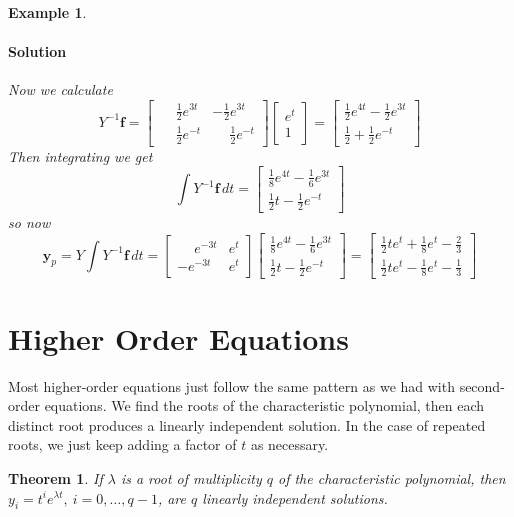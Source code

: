 \documentclass[letterpaper, 11pt, openany]{book}
\theoremstyle{mytheoremstyle}
\newtheorem{theorem}{Theorem}[section]
\theoremstyle{myexamplestyle}
\newtheorem{example}{Example}[section]
\newenvironment{solution}{\paragraph{\sffamily \smaller \fontseries{b}\selectfont Solution}}{\hfill\faSquare}
\begin{document}
\begin{example}
\begin{solution}
        Now we calculate \[Y^{-1} \mathbf{f} = \begin{bmatrix}
            \phantom{-}\frac{1}{2}e^{3t} & -\frac{1}{2} e^{3t}\\
            \phantom{-}\frac{1}{2} e^{-t} &  \phantom{-}\frac{1}{2}e^{-t}
       \end{bmatrix} \begin{bmatrix}e^{t} \\ 1\end{bmatrix} = 
       \begin{bmatrix}
            \frac{1}{2}e^{4t}  -\frac{1}{2}e^{3t}\\
            \frac{1}{2} + \frac{1}{2} e^{-t}
       \end{bmatrix}\]
       Then integrating we get \[\int Y^{-1} \mathbf{f} \, dt = \begin{bmatrix}\frac{1}{8}e^{4 t}-\frac{1}{6}e^{3 t} \\
        \frac{1}{2}t-\frac{1}{2}e^{-t}\end{bmatrix}\]
        so now
        \[\mathbf{y}_{p} = Y \int Y^{-1} \mathbf{f} \, dt  = \begin{bmatrix}
            \phantom{-}e^{-3t} & e^{t}\\
           -e^{-3t} & e^{t}
       \end{bmatrix}
       \begin{bmatrix}\frac{1}{8}e^{4 t}-\frac{1}{6}e^{3 t} \\
        \frac{1}{2}t-\frac{1}{2}e^{-t}\end{bmatrix} = \begin{bmatrix}
            \frac{1}{2}t e^t +\frac{1}{8}e^t-\frac{2}{3} \\
            \frac{1}{2} t e^t -\frac{1}{8}e^t-\frac{1}{3}
        \end{bmatrix}
       \]
    \end{solution}
\end{example}

\section{Higher Order Equations}
Most higher-order equations just follow the same pattern as we had with second-order equations. We find the roots of the characteristic polynomial, then each distinct root produces a linearly independent solution. In the case of repeated roots, we just keep adding a factor of \(t\) as necessary.
\begin{theorem}\label{t:de-repeated-root-general-case}
    If \(\lambda\) is a root of multiplicity \(q\) of the characteristic polynomial, then \(y_{i} = t^{i} e^{\lambda t}, \ i = 0, \ldots, q-1\), are \(q\) linearly independent solutions.
\end{theorem}
\end{document}
